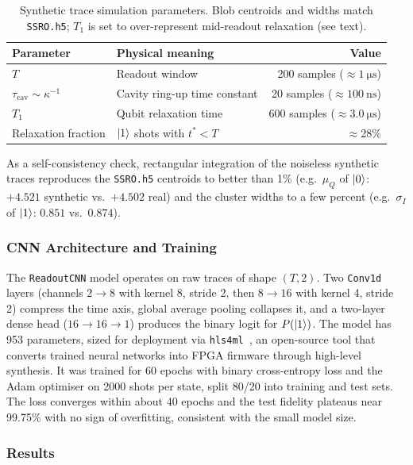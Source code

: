 \begin{table}[ht]
\centering
\caption{Synthetic trace simulation parameters.  Blob centroids and widths match
         \texttt{SSRO.h5}; $T_1$ is set to over-represent mid-readout relaxation
         (see text).}
\label{tab:sim_params}
\begin{tabular}{llr}
\toprule
Parameter & Physical meaning & Value \\
\midrule
$T$ & Readout window & 200 samples ($\approx\SI{1}{\micro\second}$) \\
$\tau_\text{cav} \sim \kappa^{-1}$ & Cavity ring-up time constant & 20 samples ($\approx\SI{100}{\nano\second}$) \\
$T_1$ & Qubit relaxation time & 600 samples ($\approx\SI{3.0}{\micro\second}$) \\
Relaxation fraction & $\ket{1}$ shots with $t^* < T$ & $\approx$28\% \\
\bottomrule
\end{tabular}
\end{table}

As a self-consistency check, rectangular integration of the noiseless synthetic
traces reproduces the \texttt{SSRO.h5} centroids to better than 1\% (e.g.\ $\mu_Q$
of $\ket{0}$: $+4.521$ synthetic vs.\ $+4.502$ real) and the cluster widths to a few
percent (e.g.\ $\sigma_I$ of $\ket{1}$: $0.851$ vs.\ $0.874$).

\subsubsection{CNN Architecture and Training}

The \texttt{ReadoutCNN} model operates on raw traces of shape $(T, 2)$.  Two
\texttt{Conv1d} layers (channels $2\!\to\!8$ with kernel 8, stride 2, then
$8\!\to\!16$ with kernel 4, stride 2) compress the time axis, global average pooling
collapses it, and a two-layer dense head ($16\!\to\!16\!\to\!1$) produces the binary
logit for $P(\ket{1})$.  The model has 953 parameters, sized for deployment via
\texttt{hls4ml}~\cite{Fahim2021}, an open-source tool that converts trained neural
networks into FPGA firmware through high-level synthesis.  It was trained for 60
epochs with binary
cross-entropy loss and the Adam optimiser on \num{2000} shots per state, split 80/20
into training and test sets.  The loss converges within about 40
epochs and the test fidelity plateaus near 99.75\% with no sign of overfitting,
consistent with the small model size.

\subsubsection{Results}

